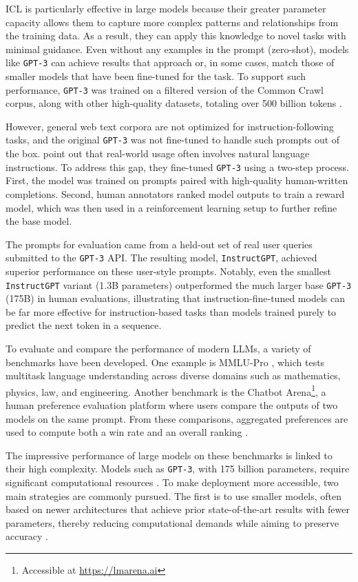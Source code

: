 \documentclass[a4paper,oneside,bibliography=totoc]{scrbook}
\begin{document}
\Ac{ICL} is particularly effective in large models because their greater parameter capacity allows them to capture more complex patterns and relationships from the training data. As a result, they can apply this knowledge to novel tasks with minimal guidance. Even without any examples in the prompt (zero-shot), models like \texttt{GPT-3} can achieve results that approach or, in some cases, match those of smaller models that have been fine-tuned for the task. To support such performance, \texttt{GPT-3} was trained on a filtered version of the Common Crawl corpus, along with other high-quality datasets, totaling over 500 billion tokens \cite{Brown2020}.

However, general web text corpora are not optimized for instruction-following tasks, and the original \texttt{GPT-3} was not fine-tuned to handle such prompts out of the box. \citet{Ouyang2022} point out that real-world usage often involves natural language instructions. To address this gap, they fine-tuned \texttt{GPT-3} using a two-step process. First, the model was trained on prompts paired with high-quality human-written completions. Second, human annotators ranked model outputs to train a reward model, which was then used in a reinforcement learning setup to further refine the base model.

The prompts for evaluation came from a held-out set of real user queries submitted to the \texttt{GPT-3} API. The resulting model, \texttt{InstructGPT}, achieved superior performance on these user-style prompts. Notably, even the smallest \texttt{InstructGPT} variant (1.3B parameters) outperformed the much larger base \texttt{GPT-3} (175B) in human evaluations, illustrating that instruction-fine-tuned models can be far more effective for instruction-based tasks than models trained purely to predict the next token in a sequence.

To evaluate and compare the performance of modern \acp{LLM}, a variety of benchmarks have been developed. One example is MMLU-Pro \cite{Wang2024}, which tests multitask language understanding across diverse domains such as mathematics, physics, law, and engineering. Another benchmark is the Chatbot Arena\footnote{Accessible at \url{https://lmarena.ai}}, a human preference evaluation platform where users compare the outputs of two models on the same prompt. From these comparisons, aggregated preferences are used to compute both a win rate and an overall ranking \cite{Chiang2024}.

The impressive performance of large models on these benchmarks is linked to their high complexity. Models such as \texttt{GPT-3}, with 175 billion parameters, require significant computational resources \cite{Brown2020,Frantar2023}. To make deployment more accessible, two main strategies are commonly pursued. The first is to use smaller models, often based on newer architectures that achieve prior state-of-the-art results with fewer parameters, thereby reducing computational demands while aiming to preserve accuracy \cite{Grattafiori2024,Meta2024}.
\end{document}
